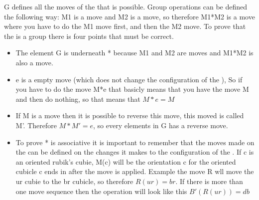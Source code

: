 G defines all the moves of the \rubik{} that is possible. Group operations can be defined the following way: M1 is a move and M2 is a move, so therefore M1*M2 is a move where you have to do the M1 move first, and then the M2 move. To prove that the \rubik{} is a group there is four points that must be correct.

\begin {itemize}
\item The element G is underneath * because M1 and M2 are moves  and M1*M2 is also a move.

\item e is a empty move (which does not change the configuration of the \rubik{}), So if you have to do the move M*e that basicly means that you have the move M and then do nothing, so that means that $M*e=M$

\item If M is a move then it is possible to reverse this move, this moved is called M'. Therefore $M*M' = e$, so every elements in G has a reverse move.

\item To prove * is associative it is important to remember that the moves made on the \rubik{} can be defined on the changes it makes to the configuration of the \rubik{}. 
If c is an oriented rubik's cubie, M(c) will be the orientation c for the oriented cubicle c ends in after the move is applied.
Example the move R wll move the ur cubie to the br cubicle, so therefore $R(ur)=br$. If there is more than one move sequence then the operation will look like this $B'(R(ur))=db$

\end {itemize}
\myTail{
}
%